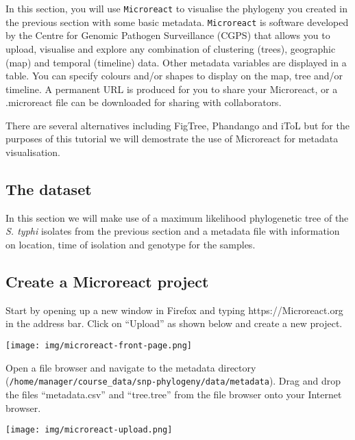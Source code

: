 \documentclass[11pt]{article}
\begin{document}
In this section, you will use \texttt{Microreact} to visualise the
phylogeny you created in the previous section with some basic metadata.
\texttt{Microreact} is software developed by the Centre for Genomic
Pathogen Surveillance (CGPS) that allows you to upload, visualise and
explore any combination of clustering (trees), geographic (map) and
temporal (timeline) data. Other metadata variables are displayed in a
table. You can specify colours and/or shapes to display on the map, tree
and/or timeline. A permanent URL is produced for you to share your
Microreact, or a .microreact file can be downloaded for sharing with
collaborators.

There are several alternatives including FigTree, Phandango and iToL but
for the purposes of this tutorial we will demostrate the use of
Microreact for metadata visualisation.

    \hypertarget{the-dataset}{%
\subsection{The dataset}\label{the-dataset}}

In this section we will make use of a maximum likelihood phylogenetic
tree of the \textit{S. typhi} isolates from the previous section and a
metadata file with information on location, time of isolation and
genotype for the samples.

    \hypertarget{create-a-microreact-project}{%
\subsection{Create a Microreact
project}\label{create-a-microreact-project}}

Start by opening up a new window in Firefox and typing
https://Microreact.org in the address bar. Click on ``Upload'' as shown
below and create a new project.


\begin{center}
\texttt{[image: img/microreact-front-page.png]}
\end{center}


Open a file browser and navigate to the metadata directory
(\texttt{/home/manager/course\_data/snp-phylogeny/data/metadata}). Drag
and drop the files ``metadata.csv'' and ``tree.tree'' from the file
browser onto your Internet browser.


\begin{center}
\texttt{[image: img/microreact-upload.png]}
\end{center}
\end{document}
